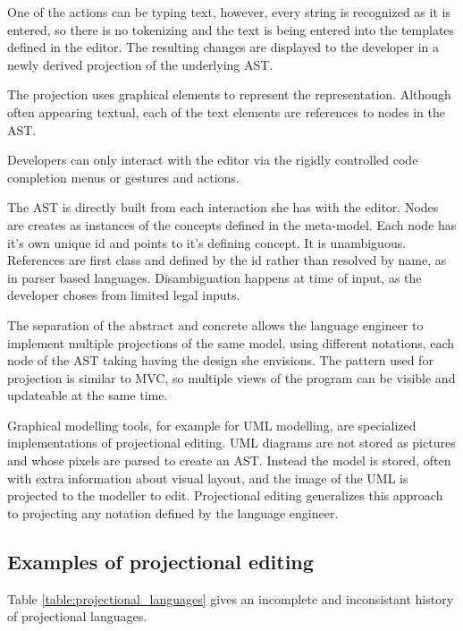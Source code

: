 One of the actions can be typing text, however, every string is recognized as it is entered, so there is no tokenizing and the text is being entered into the templates defined in the editor.
The resulting changes are displayed to the developer in a newly derived projection of the underlying AST.

The projection uses graphical elements to represent the representation.
Although often appearing textual, each of the text elements are references to nodes in the AST.

Developers can only interact with the editor via the rigidly controlled code completion menus or gestures and actions. 
    
The AST is directly built from each interaction she has with the editor.
Nodes are creates as instances of the concepts defined in the meta-model.
Each node has it's own unique id and points to it's defining concept.
It is unambiguous.
References are first class and defined by the id rather than resolved by name, as in parser based languages.
Disambiguation happens at time of input, as the developer choses from limited legal inputs.

The separation of the abstract and concrete allows the language engineer to implement multiple projections of the same model, using different notations, each node of the AST taking having the design she envisions.
The pattern used for projection is similar to MVC, so multiple views of the program can be visible and updateable at the same time.

Graphical modelling tools, for example for UML modelling, are specialized implementations of projectional editing.
UML diagrams are not stored as pictures and whose pixels are parsed to create an AST.
Instead the model is stored, often with extra information about visual layout, and the image of the UML is projected to the modeller to edit.
Projectional editing generalizes this approach to projecting any notation defined by the language engineer.



\subsection{Examples of projectional editing}

Table \ref{table:projectional_languages} gives an incomplete and inconsistant history of projectional languages.

